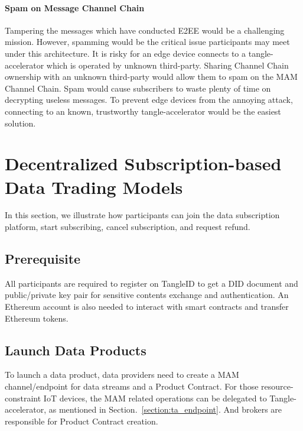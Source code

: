 \documentclass[conference]{IEEEtran}
\begin{document}
\paragraph{Spam on Message Channel Chain}
Tampering the messages which have conducted E2EE would be a challenging mission. However, spamming would be the critical issue participants may meet under this architecture. It is risky for an edge device connects to a tangle-accelerator which is operated by unknown third-party. Sharing Channel Chain ownership with an unknown third-party would allow them to spam on the MAM Channel Chain. Spam would cause subscribers to waste plenty of time on decrypting useless messages. To prevent edge devices from the annoying attack, connecting to an known, trustworthy tangle-accelerator would be the easiest solution.

\section{Decentralized Subscription-based Data Trading Models}
\label{section:trading_model}
In this section, we illustrate how participants can join the data subscription platform, start subscribing, cancel subscription, and request refund.

\subsection{Prerequisite}
All participants are required to register on TangleID to get a DID document and public/private key pair for sensitive contents exchange and authentication. An Ethereum account is also needed to interact with smart contracts and transfer Ethereum tokens.

\subsection{Launch Data Products}
\label{section:launch_data_product}
To launch a data product, data providers need to create a MAM channel/endpoint for data streams and a Product Contract. For those resource-constraint IoT devices, the MAM related operations can be delegated to Tangle-accelerator, as mentioned in Section.~\ref{section:ta_endpoint}. And brokers are responsible for Product Contract creation.
\end{document}
